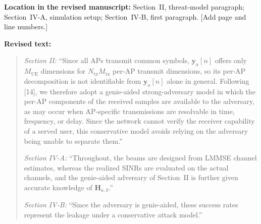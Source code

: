\documentclass[a4paper,12pt]{article}
\newcommand{\revisionlocation}[1]{\par\textbf{Location in the revised manuscript:} #1\par}
\newenvironment{revisedtext}{%
  \par\textbf{Revised text:}\begin{quote}\color{red}
}{\end{quote}}
\begin{document}
\revisionlocation{Section~II, threat-model paragraph; Section~IV-A,
simulation setup; Section~IV-B, first paragraph. [Add page and line
numbers.]}
\begin{revisedtext}
\textit{Section II:} ``Since all APs transmit common symbols,
$\mathbf{y}_a[n]$ offers only $M_{\mathrm{UE}}$ dimensions for
$N_{\mathrm{tx}}M_{\mathrm{tx}}$ per-AP transmit dimensions, so its per-AP
decomposition is not identifiable from $\mathbf{y}_a[n]$ alone in general.
Following [14], we therefore adopt a genie-aided strong-adversary model in
which the per-AP components of the received samples are available to the
adversary, as may occur when AP-specific transmissions are resolvable in
time, frequency, or delay. Since the network cannot verify the receiver
capability of a served user, this conservative model avoids relying on the
adversary being unable to separate them.''

\textit{Section IV-A:} ``Throughout, the beams are designed from LMMSE
channel estimates, whereas the realized SINRs are evaluated on the actual
channels, and the genie-aided adversary of Section~II is further given
accurate knowledge of $\mathbf{H}_{a,k}$.''

\textit{Section IV-B:} ``Since the adversary is genie-aided, these success
rates represent the leakage under a conservative attack model.''
\end{revisedtext}
\end{document}
